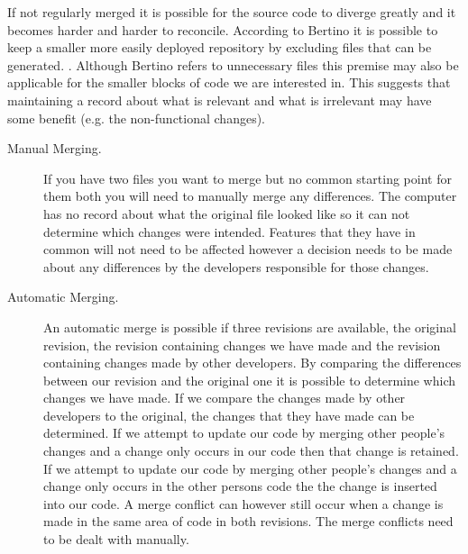 If not regularly merged it is possible for the source code to diverge greatly and it becomes harder and harder to reconcile.
 According to Bertino it is possible to keep a smaller more easily deployed repository by excluding files that can be generated. \cite{Bertino2012}. Although Bertino refers to unnecessary files this premise may also be applicable for the smaller blocks of code we are interested in. This suggests that maintaining a record about what is relevant and what is irrelevant may have some benefit (e.g. the non-functional changes).
 
\begin{description}
  \item [Manual Merging.]
If you have two files you want to merge but no common starting point for them both you will need to manually merge any differences.
The computer has no record about what the original file looked like so it can not determine which changes were intended.
Features that they have in common will not need to be affected however a decision needs to be made about any differences by the developers responsible for those changes.

  \item [Automatic Merging.] 
An automatic merge is possible if three revisions are available, the original revision, the revision containing changes we have made and the revision containing changes made by other developers. 
By comparing the differences between our revision and the original one it is possible to determine which changes we have made.  
If we compare the changes made by other developers to the original, the changes that they have made can be determined.  
If we attempt to update our code by merging other people's changes and a change only occurs in our code then that change is retained. 
If we attempt to update our code by merging other people's changes and a change only occurs in the other persons code the the change is inserted into our code.
A merge conflict can however still occur when a change is made in the same area of code in both revisions.
The merge conflicts need to be dealt with manually.


% 
\end{description}
 


